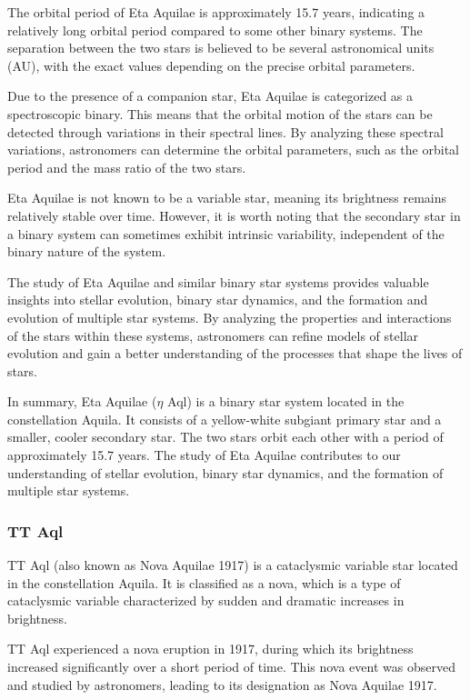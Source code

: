 The orbital period of Eta Aquilae is approximately 15.7 years, indicating a relatively long orbital period compared to some other binary systems. The separation between the two stars is believed to be several astronomical units (AU), with the exact values depending on the precise orbital parameters.

Due to the presence of a companion star, Eta Aquilae is categorized as a spectroscopic binary. This means that the orbital motion of the stars can be detected through variations in their spectral lines. By analyzing these spectral variations, astronomers can determine the orbital parameters, such as the orbital period and the mass ratio of the two stars.

Eta Aquilae is not known to be a variable star, meaning its brightness remains relatively stable over time. However, it is worth noting that the secondary star in a binary system can sometimes exhibit intrinsic variability, independent of the binary nature of the system.

The study of Eta Aquilae and similar binary star systems provides valuable insights into stellar evolution, binary star dynamics, and the formation and evolution of multiple star systems. By analyzing the properties and interactions of the stars within these systems, astronomers can refine models of stellar evolution and gain a better understanding of the processes that shape the lives of stars.

In summary, Eta Aquilae ($\eta$ Aql) is a binary star system located in the constellation Aquila. It consists of a yellow-white subgiant primary star and a smaller, cooler secondary star. The two stars orbit each other with a period of approximately 15.7 years. The study of Eta Aquilae contributes to our understanding of stellar evolution, binary star dynamics, and the formation of multiple star systems.



\subsubsection*{ TT Aql }
TT Aql (also known as Nova Aquilae 1917) is a cataclysmic variable star located in the constellation Aquila. It is classified as a nova, which is a type of cataclysmic variable characterized by sudden and dramatic increases in brightness.

TT Aql experienced a nova eruption in 1917, during which its brightness increased significantly over a short period of time. This nova event was observed and studied by astronomers, leading to its designation as Nova Aquilae 1917.


